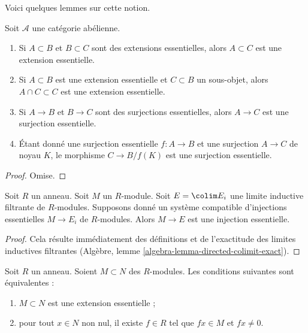 \noindent
Voici quelques lemmes sur cette notion.

\begin{lemma}
\label{lemma-essential}
Soit $\mathcal{A}$ une catégorie abélienne.
\begin{enumerate}
\item Si $A \subset B$ et $B \subset C$ sont des extensions essentielles,
alors $A \subset C$ est une extension essentielle.
\item Si $A \subset B$ est une extension essentielle et $C \subset B$
un sous-objet, alors $A \cap C \subset C$ est une extension essentielle.
\item Si $A \to B$ et $B \to C$ sont des surjections essentielles,
alors $A \to C$ est une surjection essentielle.
\item Étant donné une surjection essentielle $f : A \to B$ et une surjection
$A \to C$ de noyau $K$, le morphisme $C \to B/f(K)$ est une surjection essentielle.
\end{enumerate}
\end{lemma}

\begin{proof}
Omise.
\end{proof}

\begin{lemma}
\label{lemma-union-essential-extensions}
Soit $R$ un anneau. Soit $M$ un $R$-module. Soit $E = \colim E_i$
une limite inductive filtrante de $R$-modules. Supposons donné
un système compatible d'injections essentielles $M \to E_i$ de $R$-modules.
Alors $M \to E$ est une injection essentielle.
\end{lemma}

\begin{proof}
Cela résulte immédiatement des définitions et de l'exactitude
des limites inductives filtrantes (Algèbre, lemme \ref{algebra-lemma-directed-colimit-exact}).
\end{proof}

\begin{lemma}
\label{lemma-essential-extension}
Soit $R$ un anneau. Soient $M \subset N$ des $R$-modules.
Les conditions suivantes sont équivalentes :
\begin{enumerate}
\item $M \subset N$ est une extension essentielle ;
\item pour tout $x \in N$ non nul, il existe $f \in R$ tel que $fx \in M$
et $fx \not = 0$.
\end{enumerate}
\end{lemma}

